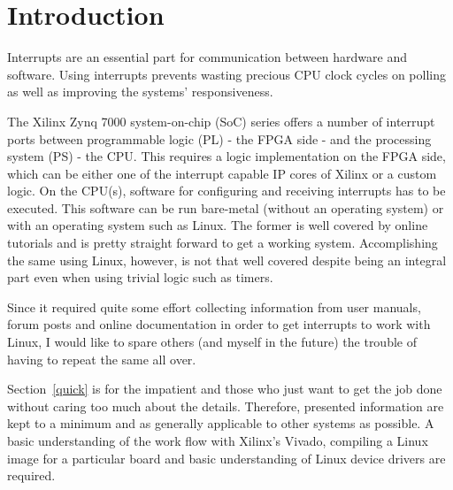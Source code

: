 \section{Introduction}
Interrupts are an essential part for communication between hardware and software.
Using interrupts prevents wasting precious CPU clock cycles on polling as well as improving the systems' responsiveness.

The Xilinx Zynq 7000 system-on-chip (SoC) series offers a number of interrupt ports between programmable logic (PL) - the FPGA side - and the processing system (PS) - the CPU.
This requires a logic implementation on the FPGA side, which can be either one of the interrupt capable IP cores of Xilinx or a custom logic.
On the CPU(s), software for configuring and receiving interrupts has to be executed.
This software can be run bare-metal (without an operating system) or with an operating system such as Linux.
The former is well covered by online tutorials and is pretty straight forward to get a working system.
Accomplishing the same using Linux, however, is not that well covered despite being an integral part even when using trivial logic such as timers.
\newline

Since it required quite some effort collecting information from user manuals, forum posts and online documentation in order to get interrupts to work with Linux, I would like to spare others (and myself in the future) the trouble of having to repeat the same all over.
\newline

Section~\ref{quick} is for the impatient and those who just want to get the job done without caring too much about the details.
Therefore, presented information are kept to a minimum and as generally applicable to other systems as possible.
A basic understanding of the work flow with Xilinx's Vivado, compiling a Linux image for a particular board and basic understanding of Linux device drivers are required.

